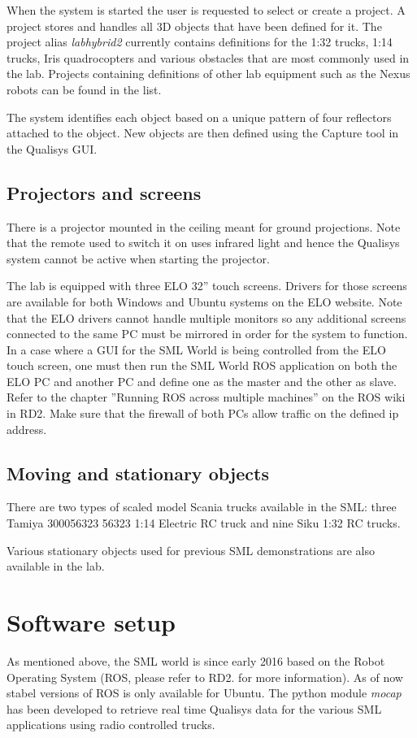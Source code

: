 \documentclass[11pt,a4paper]{book}
\begin{document}
When the system is started the user is requested to select or create a project. A project stores and handles all 3D objects that have been defined for it. The project alias \textit{labhybrid2} currently contains definitions for the 1:32 trucks, 1:14 trucks, Iris quadrocopters and various obstacles that are most commonly used in the lab. Projects containing definitions of other lab equipment such as the Nexus robots can be found in the list. 

The system identifies each object based on a unique pattern of four reflectors attached to the object. New objects are then defined using the Capture tool in the Qualisys GUI.


\subsection{Projectors and screens}
There is a projector mounted in the ceiling meant for ground projections. Note that the remote used to switch it on uses infrared light and hence the Qualisys system cannot be active when starting the projector.

The lab is equipped with three ELO 32'' touch screens. Drivers for those screens are available for both Windows and Ubuntu systems on the ELO website. Note that the ELO drivers cannot handle multiple monitors so any additional screens connected to the same PC must be mirrored in order for the system to function. In a case where a GUI for the SML World is being controlled from the ELO touch screen, one must then run the SML World ROS application on both the ELO PC and another PC and define one as the master and the other as slave. Refer to the chapter ''Running ROS across multiple machines'' on the ROS wiki in RD2. Make sure that the firewall of both PCs allow traffic on the defined ip address. 

\subsection{Moving and stationary objects}
There are two types of scaled model Scania trucks available in the SML: three Tamiya 300056323 56323 1:14 Electric RC truck and nine Siku 1:32 RC trucks.

Various stationary objects used for previous SML demonstrations are also available in the lab.

\section{Software setup}
As mentioned above, the SML world is since early 2016 based on the Robot Operating System (ROS, please refer to RD2. for more information). As of now stabel versions of ROS is only available for Ubuntu. The python module \textit{mocap} has been developed to retrieve real time Qualisys data for the various SML applications using radio controlled trucks.
\end{document}
